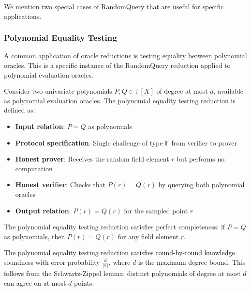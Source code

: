 We mention two special cases of RandomQuery that are useful for specific applications.

\subsubsection{Polynomial Equality Testing}

A common application of oracle reductions is testing equality between polynomial oracles. This is a specific instance of the RandomQuery reduction applied to polynomial evaluation oracles.

\begin{definition}
    \label{def:polynomial_equality_testing}
    Consider two univariate polynomials $P, Q \in \mathbb{F}[X]$ of degree at most $d$, available as polynomial evaluation oracles. The polynomial equality testing reduction is defined as:
    \begin{itemize}
        \item \textbf{Input relation}: $P = Q$ as polynomials
        \item \textbf{Protocol specification}: Single challenge of type $\mathbb{F}$ from verifier to prover
        \item \textbf{Honest prover}: Receives the random field element $r$ but performs no computation
        \item \textbf{Honest verifier}: Checks that $P(r) = Q(r)$ by querying both polynomial oracles
        \item \textbf{Output relation}: $P(r) = Q(r)$ for the sampled point $r$
    \end{itemize}
\end{definition}

\begin{theorem}
    The polynomial equality testing reduction satisfies perfect completeness: if $P = Q$ as polynomials, then $P(r) = Q(r)$ for any field element $r$.
\end{theorem}

\begin{theorem}
    The polynomial equality testing reduction satisfies round-by-round knowledge soundness with error probability $\frac{d}{|\mathbb{F}|}$, where $d$ is the maximum degree bound. This follows from the Schwartz-Zippel lemma: distinct polynomials of degree at most $d$ can agree on at most $d$ points.
\end{theorem}

